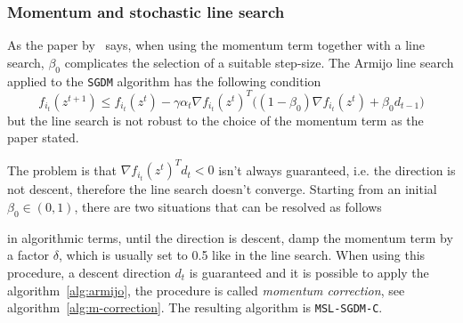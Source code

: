 \subsubsection{Momentum and stochastic line search}

As the paper by~\textcite{fan_msl_2023} says, when using the momentum term together with a line search, $\beta_0$ complicates the selection of a suitable step-size. The Armijo line search applied to the \texttt{SGDM} algorithm has the following condition
\begin{equation}\label{eq:armijo-sgdm}
f_{i_t}(z^{t+1})\leq f_{i_t}(z^t)-\gamma\alpha_t\nabla f_{i_t}(z^t)^T\bigl((1-\beta_0)\nabla f_{i_t}(z^t)+\beta_0d_{t-1}\bigr)
\end{equation}
but the line search is not robust to the choice of the momentum term as the paper stated.

The problem is that $\nabla f_{i_t}(z^t)^Td_t<0$ isn't always guaranteed, i.e. the direction is not descent, therefore the line search doesn't converge. Starting from an initial $\beta_0\in(0,1)$, there are two situations that can be resolved as follows
\begin{center}
\end{center}
in algorithmic terms, until the direction is descent, damp the momentum term by a factor $\delta$, which is usually set to \num{0.5} like in the line search. When using this procedure, a descent direction $d_t$ is guaranteed and it is possible to apply the algorithm~\ref{alg:armijo}, the procedure is called \emph{momentum correction}, see algorithm~\vref{alg:m-correction}. The resulting algorithm is \texttt{MSL-SGDM-C}.\par\smallskip

